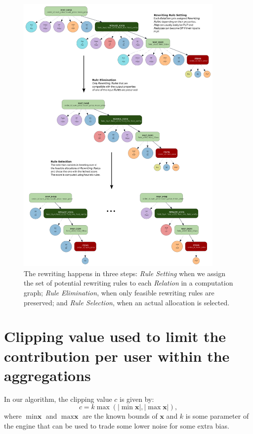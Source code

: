 \documentclass[letterpaper]{article} %
\begin{document}
\begin{figure}[t]
    \centering
    \includegraphics[width=0.9\textwidth]{figures/set_eliminate_select} %
    \caption{The rewriting happens in three steps: \emph{Rule Setting} when we assign the set of potential rewriting rules to each \emph{Relation} in a computation graph; \emph{Rule Elimination}, when only feasible rewriting rules are preserved; and \emph{Rule Selection}, when an actual allocation is selected.}
    \label{fig:set_eliminate_select}
\end{figure}


\section*{Clipping value used to limit the contribution per user within the aggregations}
\label{sec:limit_contrib_per_user}

In our algorithm, the clipping value $c$ is given by:
\begin{equation}
    c = k \max ( |\min \textbf{x}|, |\max \textbf{x}|),
\end{equation}
where $\min \textbf{x}$ and $\max \textbf{x}$ are the known bounds of $\textbf{x}$ and $k$ is some parameter of the engine that can be used to trade some lower noise for some extra bias.
\end{document}
